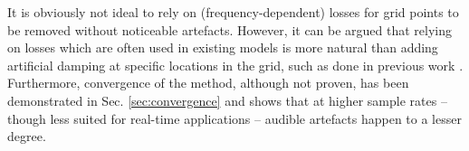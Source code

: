 \documentclass[fleqn]{jaes}
\def\SWcomment[#1]{\textcolor{blue}{#1}}
\begin{document}

It is obviously not ideal to rely on (frequency-dependent) losses for grid points to be removed without noticeable artefacts. However, it can be argued that relying on losses which are often used in existing models is more natural than adding artificial damping at specific locations in the grid, such as done in previous work \cite{Willemsen2021a, Willemsen2021b}. Furthermore, convergence of the method, although not proven, has been demonstrated in Sec. \ref{sec:convergence} and shows that at higher sample rates -- though less suited for real-time applications -- audible artefacts happen to a lesser degree. %






\end{document}
